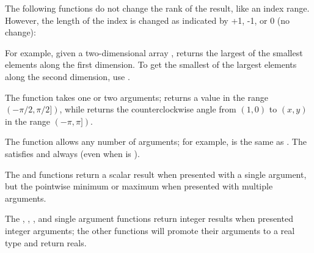 The following functions do not change the rank of the result, like an
index range.  However, the length of the index is changed as indicated
by +1, -1, or 0 (no change):

\beginindentedkeys
{}
\endindentedkeys

For example, given a two-dimensional array , 
returns the largest of the smallest elements along the first dimension.
To get the smallest of the largest elements along the second dimension,
use .



The  function takes one or two arguments; 
returns a value in the range $(-\pi/2,\pi/2])$, while 
returns the counterclockwise angle from $(1,0)$ to $(x,y)$ in the
range $(-\pi,\pi])$.

The  function allows any number of arguments; for example,
 is the same as .
The  satisfies  and 
always (even when  is ).

The  and  functions return a scalar result when
presented with a single argument, but the pointwise minimum or maximum
when presented with multiple arguments.

The , , , and single argument 
functions return integer results when presented integer arguments; the
other functions will promote their arguments to a real type and return
reals.

